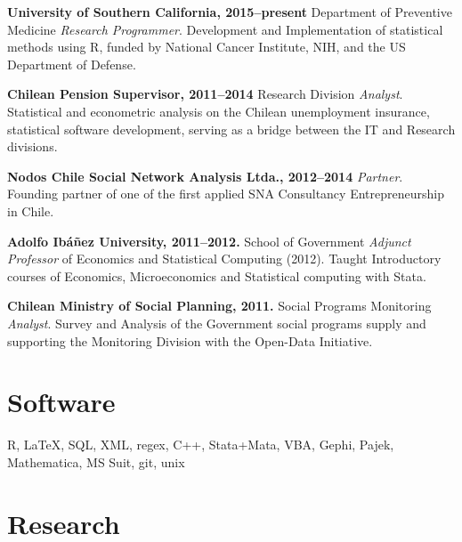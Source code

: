 \documentclass[letterpaper, 11pt]{article}
\renewenvironment{itemize}{
  \begin{list}{}{
    \setlength{\leftmargin}{0.45cm}
  }
}{
  \end{list}
}
\begin{document}
\begin{itemize}
\item \textbf{University of Southern California, 2015--present} Department of Preventive Medicine \emph{Research Programmer}. Development and Implementation of statistical methods using R, funded by National Cancer Institute, NIH, and the US Department of Defense.
\item \textbf{Chilean Pension Supervisor, 2011--2014} Research Division \emph{Analyst}. Statistical and econometric analysis on the Chilean unemployment insurance, statistical software development, serving as a bridge between the IT and Research divisions.
\item \textbf{Nodos Chile Social Network Analysis Ltda., 2012--2014} \emph{Partner}.
Founding partner of one of the first applied SNA Consultancy Entrepreneurship in Chile.
\item \textbf{Adolfo Ib\'a\~nez University, 2011--2012.} School of Government \emph{Adjunct Professor} of Economics and Statistical Computing (2012).
Taught Introductory courses of Economics, Microeconomics and Statistical computing with Stata.
\item \textbf{Chilean Ministry of Social Planning, 2011.} Social Programs Monitoring \emph{Analyst}.
Survey and Analysis of the Government social programs supply and supporting the Monitoring Division with the Open-Data Initiative.
\end{itemize}

\section*{Software}

\begin{itemize}
\item[] R, \LaTeX, SQL, XML, regex, C++, Stata+Mata, VBA, Gephi, Pajek, Mathematica, MS Suit, git, unix
\end{itemize}

\section*{Research}
\end{document}
